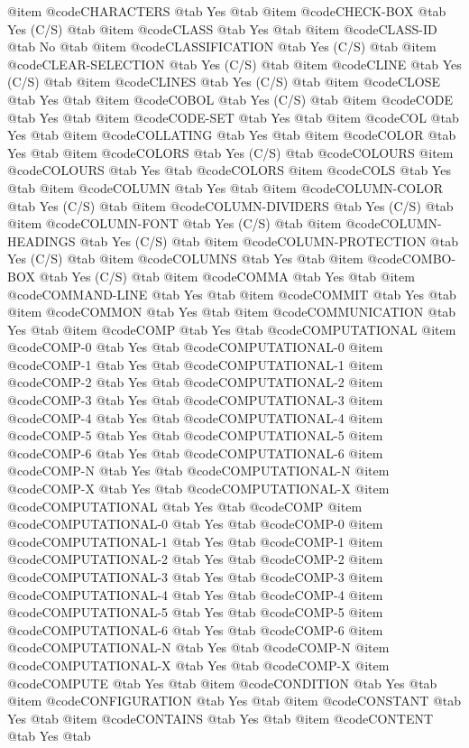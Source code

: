 @item @code{CHARACTERS} @tab Yes @tab 
@item @code{CHECK-BOX} @tab Yes	(C/S) @tab 
@item @code{CLASS} @tab Yes @tab 
@item @code{CLASS-ID} @tab No @tab 
@item @code{CLASSIFICATION} @tab Yes	(C/S) @tab 
@item @code{CLEAR-SELECTION} @tab Yes	(C/S) @tab 
@item @code{CLINE} @tab Yes	(C/S) @tab 
@item @code{CLINES} @tab Yes	(C/S) @tab 
@item @code{CLOSE} @tab Yes @tab 
@item @code{COBOL} @tab Yes	(C/S) @tab 
@item @code{CODE} @tab Yes @tab 
@item @code{CODE-SET} @tab Yes @tab 
@item @code{COL} @tab Yes @tab 
@item @code{COLLATING} @tab Yes @tab 
@item @code{COLOR} @tab Yes @tab 
@item @code{COLORS} @tab Yes	(C/S) @tab @code{COLOURS}
@item @code{COLOURS} @tab Yes @tab @code{COLORS}
@item @code{COLS} @tab Yes @tab 
@item @code{COLUMN} @tab Yes @tab 
@item @code{COLUMN-COLOR} @tab Yes	(C/S) @tab 
@item @code{COLUMN-DIVIDERS} @tab Yes	(C/S) @tab 
@item @code{COLUMN-FONT} @tab Yes	(C/S) @tab 
@item @code{COLUMN-HEADINGS} @tab Yes	(C/S) @tab 
@item @code{COLUMN-PROTECTION} @tab Yes	(C/S) @tab 
@item @code{COLUMNS} @tab Yes @tab 
@item @code{COMBO-BOX} @tab Yes	(C/S) @tab 
@item @code{COMMA} @tab Yes @tab 
@item @code{COMMAND-LINE} @tab Yes @tab 
@item @code{COMMIT} @tab Yes @tab 
@item @code{COMMON} @tab Yes @tab 
@item @code{COMMUNICATION} @tab Yes @tab 
@item @code{COMP} @tab Yes @tab @code{COMPUTATIONAL}
@item @code{COMP-0} @tab Yes @tab @code{COMPUTATIONAL-0}
@item @code{COMP-1} @tab Yes @tab @code{COMPUTATIONAL-1}
@item @code{COMP-2} @tab Yes @tab @code{COMPUTATIONAL-2}
@item @code{COMP-3} @tab Yes @tab @code{COMPUTATIONAL-3}
@item @code{COMP-4} @tab Yes @tab @code{COMPUTATIONAL-4}
@item @code{COMP-5} @tab Yes @tab @code{COMPUTATIONAL-5}
@item @code{COMP-6} @tab Yes @tab @code{COMPUTATIONAL-6}
@item @code{COMP-N} @tab Yes @tab @code{COMPUTATIONAL-N}
@item @code{COMP-X} @tab Yes @tab @code{COMPUTATIONAL-X}
@item @code{COMPUTATIONAL} @tab Yes @tab @code{COMP}
@item @code{COMPUTATIONAL-0} @tab Yes @tab @code{COMP-0}
@item @code{COMPUTATIONAL-1} @tab Yes @tab @code{COMP-1}
@item @code{COMPUTATIONAL-2} @tab Yes @tab @code{COMP-2}
@item @code{COMPUTATIONAL-3} @tab Yes @tab @code{COMP-3}
@item @code{COMPUTATIONAL-4} @tab Yes @tab @code{COMP-4}
@item @code{COMPUTATIONAL-5} @tab Yes @tab @code{COMP-5}
@item @code{COMPUTATIONAL-6} @tab Yes @tab @code{COMP-6}
@item @code{COMPUTATIONAL-N} @tab Yes @tab @code{COMP-N}
@item @code{COMPUTATIONAL-X} @tab Yes @tab @code{COMP-X}
@item @code{COMPUTE} @tab Yes @tab 
@item @code{CONDITION} @tab Yes @tab 
@item @code{CONFIGURATION} @tab Yes @tab 
@item @code{CONSTANT} @tab Yes @tab 
@item @code{CONTAINS} @tab Yes @tab 
@item @code{CONTENT} @tab Yes @tab 
